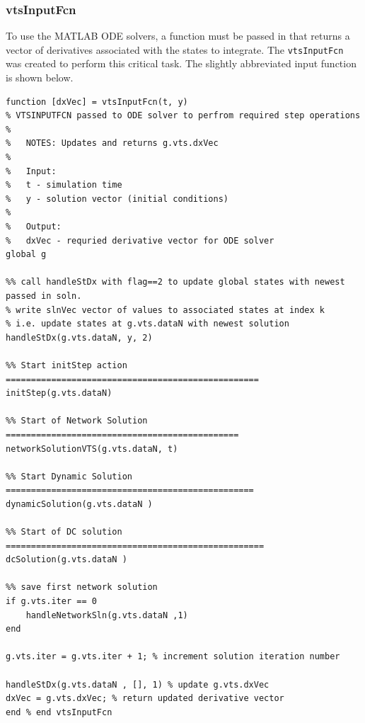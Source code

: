 \subsubsection{vtsInputFcn} 
To use the MATLAB ODE solvers, a function must be passed in that returns a vector of derivatives associated with the states to integrate.
The \verb|vtsInputFcn| was created to perform this critical task.
The slightly abbreviated input function is shown below.
\begin{verbatim}
function [dxVec] = vtsInputFcn(t, y)
% VTSINPUTFCN passed to ODE solver to perfrom required step operations
%
%   NOTES: Updates and returns g.vts.dxVec
%
%   Input:
%   t - simulation time
%   y - solution vector (initial conditions)
%
%   Output:
%   dxVec - requried derivative vector for ODE solver
global g

%% call handleStDx with flag==2 to update global states with newest passed in soln.
% write slnVec vector of values to associated states at index k
% i.e. update states at g.vts.dataN with newest solution
handleStDx(g.vts.dataN, y, 2)

%% Start initStep action ==================================================
initStep(g.vts.dataN)

%% Start of Network Solution ==============================================
networkSolutionVTS(g.vts.dataN, t)

%% Start Dynamic Solution =================================================
dynamicSolution(g.vts.dataN )

%% Start of DC solution ===================================================
dcSolution(g.vts.dataN )

%% save first network solution
if g.vts.iter == 0
    handleNetworkSln(g.vts.dataN ,1)
end

g.vts.iter = g.vts.iter + 1; % increment solution iteration number

handleStDx(g.vts.dataN , [], 1) % update g.vts.dxVec
dxVec = g.vts.dxVec; % return updated derivative vector
end % end vtsInputFcn
\end{verbatim}


